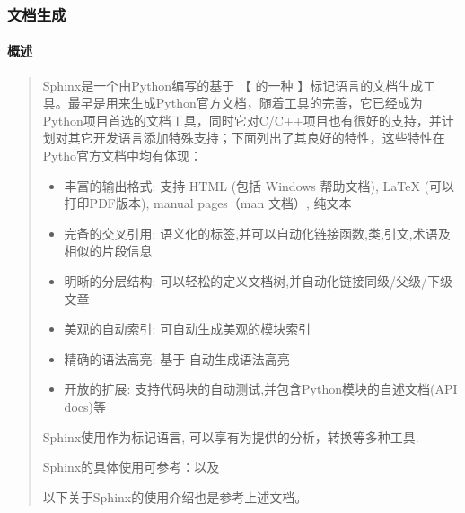 \documentclass[a4paper,10pt,english]{sphinxmanual}
\begin{document}
\subsubsection{文档生成}
\label{\detokenize{sphinx/1-generate/index::doc}}\label{\detokenize{sphinx/1-generate/index:id1}}

\paragraph{概述}
\label{\detokenize{sphinx/1-generate/index:id2}}\begin{quote}

Sphinx是一个由Python编写的基于  【  的一种 】标记语言的文档生成工具。最早是用来生成Python官方文档，随着工具的完善，它已经成为Python项目首选的文档工具，同时它对C/C++项目也有很好的支持，并计划对其它开发语言添加特殊支持；下面列出了其良好的特性，这些特性在Pytho官方文档中均有体现：
\begin{itemize}
\item {} 
丰富的输出格式: 支持 HTML (包括 Windows 帮助文档), LaTeX (可以打印PDF版本), manual pages（man 文档）, 纯文本

\item {} 
完备的交叉引用: 语义化的标签,并可以自动化链接函数,类,引文,术语及相似的片段信息

\item {} 
明晰的分层结构: 可以轻松的定义文档树,并自动化链接同级/父级/下级文章

\item {} 
美观的自动索引: 可自动生成美观的模块索引

\item {} 
精确的语法高亮: 基于  自动生成语法高亮

\item {} 
开放的扩展: 支持代码块的自动测试,并包含Python模块的自述文档(API docs)等

\end{itemize}

Sphinx使用作为标记语言, 可以享有为提供的分析，转换等多种工具.

Sphinx的具体使用可参考：以及

以下关于Sphinx的使用介绍也是参考上述文档。
\end{quote}
\end{document}
